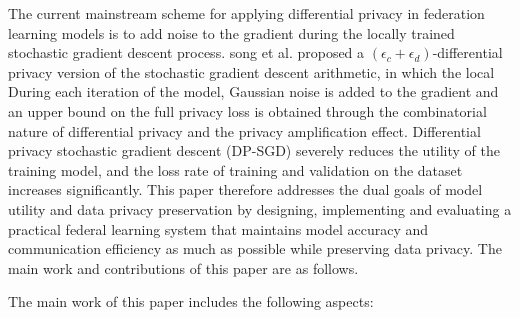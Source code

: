 The current mainstream scheme for applying differential privacy in federation learning models is to add noise to the gradient during the locally trained stochastic gradient descent process. song et al.  proposed a $\left(\epsilon_{c}+\epsilon_{d}\right)$-differential privacy version of the stochastic gradient descent arithmetic, in which the local During each iteration of the model, Gaussian noise is added to the gradient and an upper bound on the full privacy loss is obtained through the combinatorial nature of differential privacy and the privacy amplification effect. Differential privacy stochastic gradient descent (DP-SGD) severely reduces the utility of the training model, and the loss rate of training and validation on the dataset increases significantly. This paper therefore addresses the dual goals of model utility and data privacy preservation by designing, implementing and evaluating a practical federal learning system that maintains model accuracy and communication efficiency as much as possible while preserving data privacy. The main work and contributions of this paper are as follows.

The main work of this paper includes the following aspects:

